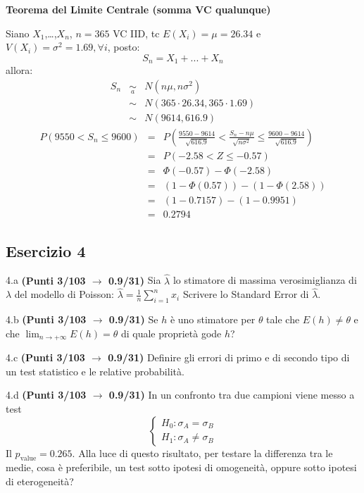 \documentclass[
  11pt,
]{book}
\theoremstyle{mytheoremstyle}
\theoremstyle{mydefstyle}
\newenvironment{sol}
  {
  \begin{tcolorbox}[enhanced,breakable,arc=0.1mm,boxrule=1pt,colback=white,colframe=iblue,
  title=\bf \fontfamily{lmss}\selectfont \hspace{.5 cm} Soluzione,drop fuzzy shadow]

}{
\end{tcolorbox}
  }
\begin{document}
\begin{sol}
\textbf{Teorema del Limite Centrale (somma VC qualunque)}

Siano \(X_1\),\ldots,\(X_n\), \(n=365\) VC IID, tc \(E(X_i)=\mu=26.34\) e \(V(X_i)=\sigma^2=1.69,\forall i\), posto:
\[
      S_n = X_1 + ... + X_n
      \]
allora:\begin{eqnarray*}
  S_n & \mathop{\sim}\limits_{a}& N(n\mu,n\sigma^2) \\
     &\sim & N(365\cdot26.34,365\cdot1.69) \\
     &\sim & N(9614,616.9) 
  \end{eqnarray*}\begin{eqnarray*}
   P( 9550 < S_n \leq  9600 ) &=& P\left( \frac { 9550  -  9614 }{\sqrt{ 616.9 }} < \frac { S_n  -  n\mu }{ \sqrt{n\sigma^2} } \leq \frac { 9600  -  9614 }{\sqrt{ 616.9 }}\right)  \\
              &=& P\left(  -2.58  < Z \leq  -0.57 \right) \\
              &=& \Phi( -0.57 )-\Phi( -2.58 )\\
              &=&  (1-\Phi( 0.57 ))-(1-\Phi( 2.58 )) \\ &=& (1- 0.7157 )-(1- 0.9951 ) \\ 
              &=&  0.2794 
   \end{eqnarray*}

\end{sol}

\subsection{Esercizio 4}\label{esercizio-4-12}

4.a \textbf{(Punti 3/103 \(\rightarrow\) 0.9/31)} Sia \(\hat \lambda\) lo stimatore di massima verosimiglianza di \(\lambda\) del modello di Poisson: \(\hat\lambda =  \frac 1n\sum_{i=1}^nx_i\)
Scrivere lo Standard Error di \(\hat \lambda\).

4.b \textbf{(Punti 3/103 \(\rightarrow\) 0.9/31)} Se \(h\) è uno stimatore per \(\theta\) tale che
\(E(h)\ne \theta\) e che \(\lim_ {n\to +\infty}E(h)=\theta\) di quale proprietà gode \(h\)?

4.c \textbf{(Punti 3/103 \(\rightarrow\) 0.9/31)} Definire gli errori di primo e di secondo tipo di un test statistico e le relative probabilità.

4.d \textbf{(Punti 3/103 \(\rightarrow\) 0.9/31)} In un confronto tra due campioni viene messo a test
\[
\begin{cases}
H_0:\sigma_A=\sigma_B\\
H_1:\sigma_A\ne \sigma_B
\end{cases}
\]
Il \(p_\text{value}=0.265\). Alla luce di questo risultato, per testare la differenza tra le medie, cosa è preferibile, un test sotto ipotesi di omogeneità, oppure sotto ipotesi di eterogeneità?
\end{document}
